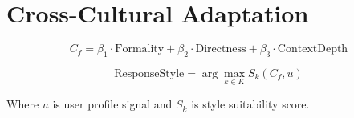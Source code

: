 \section*{Cross-Cultural Adaptation}

\[
C_f = \beta_1 \cdot \text{Formality} + \beta_2 \cdot \text{Directness} + \beta_3 \cdot \text{ContextDepth}
\]

\[
\text{ResponseStyle} = \arg\max_{k\in K} S_k(C_f, u)
\]

Where $u$ is user profile signal and $S_k$ is style suitability score.
